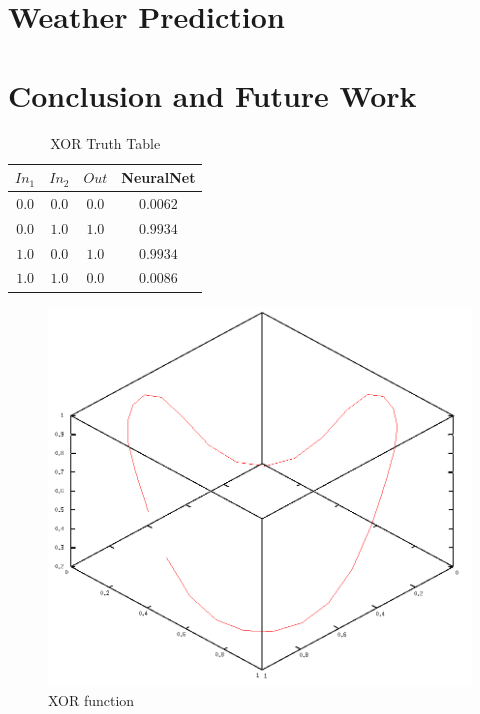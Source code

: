 \documentclass{article}
\begin{document}
\begin{multicols}{2}
\section{Weather Prediction}

\section{Conclusion and Future Work}




\end{multicols}

\begin{table}[ht]
	\caption{XOR Truth Table}
	\label{tab:xortable}
	\begin{center}
		\begin{tabular}{cc|cc}
		\hline
		\hline
		\textbf{$In_1$} & \textbf{$In_2$} & \textbf{$Out$} & NeuralNet \\
		\hline
			$0.0$ & $0.0$ & $0.0$ & $0.0062$\\
			$0.0$ & $1.0$ & $1.0$ & $0.9934$\\
			$1.0$ & $0.0$ & $1.0$ & $0.9934$\\
			$1.0$ & $1.0$ & $0.0$ & $0.0086$\\
		\hline

		\hline
		\end{tabular}
	\end{center}
\end{table}

\begin{figure}[tb]
	\begin{center}
		\includegraphics[scale=0.5]{img/xor1}
	\end{center}
	\caption{XOR function}
	\label{fig:xor1}
\end{figure}
\end{document}
